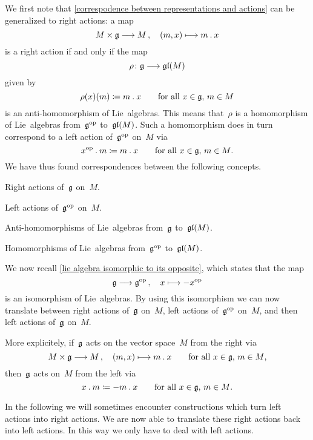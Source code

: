 \begin{remark}
  We first note that \cref{correspodence between representations and actions} can be generalized to right actions:
  a map
  \[
    M \times \glie
    \to
    M \,,
    \quad
    (m,x)
    \mapsto
    m \act x
  \]
  is a right action if and only if the map
  \[
    \rho
    \colon
    \glie
    \to
    \gllie(M)
  \]
  given by
  \[
    \rho(x)(m)
    \coloneqq
    m \mathbin{.} x
    \qquad
    \text{for all~$x \in \mathfrak{g}$,~$m \in M$}
  \]
  is an anti-homomorphism of Lie~algebras.
  This means that~$\rho$ is a homomorphism of Lie~algebras from~$\mathfrak{g}^{\mathrm{op}}$ to~$\mathfrak{gl}(M)$.
  Such a homomorphism does in turn correspond to a left action of~$\mathfrak{g}^{\mathrm{op}}$ on~$M$ via
  \[
    x^{\mathrm{op}} \mathbin{.} m
    \coloneqq
    m \mathbin{.} x
    \qquad
    \text{for all~$x \in \mathfrak{g}$,~$m \in M$.}
  \]
  We have thus found {\onetoonetext} correspondences between the following concepts.
  \begin{equivalenceslist*}
    \item
      Right actions of~$\mathfrak{g}$ on~$M$.
    \item
      Left actions of~$\mathfrak{g}^{\mathrm{op}}$ on~$M$.
    \item
      Anti-homomorphisms of Lie~algebras from~$\mathfrak{g}$ to~$\mathfrak{gl}(M)$.
    \item
      Homomorphisms of Lie~algebras from~$\mathfrak{g}^{\mathrm{op}}$ to~$\mathfrak{gl}(M)$.
  \end{equivalenceslist*}
  We now recall \cref{lie algebra isomorphic to its opposite}, which states that the map
  \[
    \glie
    \to
    \glie^{\op} \,,
    \quad
    x
    \mapsto
    -x^{\op}
  \]
  is an isomorphism of Lie~algebras.
  By using this isomorphism we can now translate between right actions of~$\mathfrak{g}$ on~$M$, left actions of~$\mathfrak{g}^{\mathrm{op}}$ on~$M$, and then left actions of~$\mathfrak{g}$ on~$M$.

  More explicitely, if~$\mathfrak{g}$ acts on the vector space~$M$ from the right via
  \[
    M \times \glie
    \to
    M \,,
    \quad
    (m,x)
    \mapsto
    m \act x
    \qquad
    \text{for all~$x \in \glie$,~$m \in M$,}
  \]
  then~$\mathfrak{g}$ acts on~$M$ from the left via
  \[
    x \mathbin{.} m
    \coloneqq
    -m \mathbin{.} x
    \qquad
    \text{for all~$x \in \mathfrak{g}$,~$m \in M$.}
  \]

  In the following we will sometimes encounter constructions which turn left actions into right actions.
  We are now able to translate these right actions back into left actions.
  In this way we only have to deal with left actions.
\end{remark}





